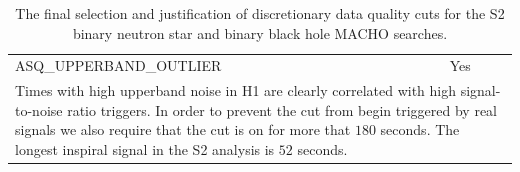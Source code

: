 \begin{table}[p]
\begin{center}
\begin{tabular}{ll}
\\
ASQ\_UPPERBAND\_OUTLIER   & Yes \\
\multicolumn{2}{l}{\parbox{\linewidth}{\footnotesize Times with high upperband
noise in H1 are clearly correlated with high signal-to-noise ratio triggers.
In order to prevent the cut from begin triggered by real signals we also
require that the cut is on for more that $180$ seconds. The longest inspiral
signal in the S2 analysis is $52$ seconds.\baselineskip=14pt}}\\
\end{tabular}
\end{center}
\caption{\label{t:s2dqchoice}%
The final selection and justification of discretionary data quality cuts for
the S2 binary neutron star and binary black hole MACHO searches.}
\end{table}

